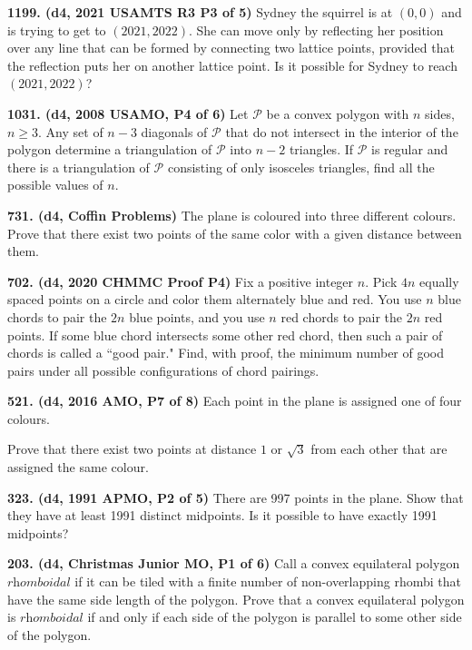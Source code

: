 \documentclass{article}
\begin{document}
\textbf{1199. (\color{red}d4\color{black}, 2021 USAMTS R3 P3 of 5)} Sydney the squirrel is at $(0, 0)$ and is trying to get to $(2021, 2022).$ She can move only by reflecting her position over any line that can be formed by connecting two lattice points, provided that the reflection puts her on another lattice point. Is it possible for Sydney to reach $(2021, 2022)$?


\textbf{1031. (\color{red}d4\color{black}, 2008 USAMO, P4 of 6)} Let $\mathcal{P}$ be a convex polygon with $n$ sides, $n\ge3$. Any set of $n-3$ diagonals of $\mathcal{P}$ that do not intersect in the interior of the polygon determine a triangulation of $\mathcal{P}$ into $n - 2$ triangles. If $\mathcal{P}$ is regular and there is a triangulation of $\mathcal{P}$ consisting of only isosceles triangles, find all the possible values of $n$.

\textbf{731. (\color{red}d4\color{black}, Coffin Problems)} The plane is coloured into three different colours. Prove that there exist two points of the same color with a given distance between them.

\textbf{702. (\color{red}d4\color{black}, 2020 CHMMC Proof P4)} Fix a positive integer $n$. Pick $4n$ equally spaced points on a circle and color them alternately
blue and red. You use $n$ blue chords to pair the $2n$ blue points, and you use $n$ red chords to pair
the $2n$ red points. If some blue chord intersects some other red chord, then such a pair of chords
is called a “good pair."  Find, with proof, the minimum number of good pairs
under all possible configurations of chord pairings.

\textbf{521. (\color{red}d4\color{black}, 2016 AMO, P7 of 8)} Each point in the plane is assigned one of four colours.

Prove that there exist two points at distance $1$ or $\sqrt3$ from each other that are assigned the same colour.

\textbf{323. (\color{red}d4\color{black}, 1991 APMO, P2 of 5)} There are 997 points in the plane. Show that they have at least 1991 distinct midpoints. Is it possible to have exactly 1991 midpoints?

\textbf{203. (\color{red}d4\color{black}, Christmas Junior MO, P1 of 6)} Call a convex equilateral polygon $\textit{rhomboidal}$ if it can be tiled with a finite number of non-overlapping rhombi that have the same side length of the polygon. Prove that a convex equilateral polygon is $\textit{rhomboidal}$ if and only if each side of the polygon is parallel to some other side of the polygon.
\end{document}
